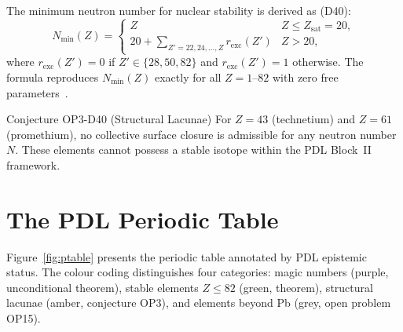 \documentclass[11pt,a4paper]{article}
\theoremstyle{definition}
\theoremstyle{remark}
\begin{document}
The minimum neutron number for nuclear stability is derived as (D40):
\begin{equation}
  N_{\min}(Z) = \begin{cases}
    Z & Z \leq Z_{\mathrm{sat}} = 20, \\
    20 + \displaystyle\sum_{Z'=22,24,\ldots,Z} r_{\mathrm{exc}}(Z') & Z > 20,
  \end{cases}
  \label{eq:nmin}
\end{equation}
where $r_{\mathrm{exc}}(Z') = 0$ if $Z' \in \{28,50,82\}$ and $r_{\mathrm{exc}}(Z')=1$ otherwise. The formula reproduces $N_{\min}(Z)$ exactly for all $Z = 1$--$82$ with zero free parameters~\cite{Laubscher_D40_2025}.

\begin{pdlconjecture}{Conjecture OP3-D40 (Structural Lacunae)}
For $Z=43$ (technetium) and $Z=61$ (promethium), no collective surface closure is admissible for any neutron number $N$. These elements cannot possess a stable isotope within the PDL Block~II framework.
\end{pdlconjecture}

\clearpage
\section{The PDL Periodic Table}
\label{sec:table}

Figure~\ref{fig:ptable} presents the periodic table annotated by PDL epistemic status. The colour coding distinguishes four categories: magic numbers (purple, unconditional theorem), stable elements $Z\leq82$ (green, theorem), structural lacunae (amber, conjecture OP3), and elements beyond Pb (grey, open problem OP15).
\end{document}
